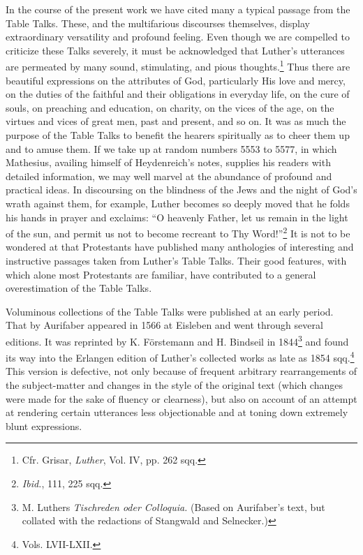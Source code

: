 In the course of the present work we have cited many a typical
passage from the Table Talks. These, and the multifarious discourses
themselves, display extraordinary versatility and profound feeling.
Even though we are compelled to criticize these Talks severely, it
must be acknowledged that Luther’s utterances are permeated by
many sound, stimulating, and pious thoughts.\footnote{Cfr. Grisar, \textit{Luther}, Vol. IV, pp. 262 sqq.}
 Thus there are beautiful
expressions on the attributes of God, particularly His love and
mercy, on the duties of the faithful and their obligations in everyday
life, on the cure of souls, on preaching and education, on charity,
on the vices of the age, on the virtues and vices of great men, past and
present, and so on. It was as much the purpose of the Table Talks
to benefit the hearers spiritually as to cheer them up and to amuse
them. If we take up at random numbers 5553 to 5577, in which
Mathesius, availing himself of Heydenreich’s notes, supplies his readers
with detailed information, we may well marvel at the abundance
of profound and practical ideas. In discoursing on the blindness of
the Jews and the night of God’s wrath against them, for example,
Luther becomes so deeply moved that he folds his hands in prayer
and exclaims: “O heavenly Father, let us remain in the light of the
sun, and permit us not to become recreant to Thy Word!”\footnote{\textit{Ibid.}, 111, 225 sqq.}
 It is not
to be wondered at that Protestants have published many anthologies
of interesting and instructive passages taken from Luther’s Table
Talks. Their good features, with which alone most Protestants are
familiar, have contributed to a general overestimation of the Table
Talks.

Voluminous collections of the Table Talks were published at an
early period. That by Aurifaber appeared in 1566 at Eisleben and
went through several editions. It was reprinted by K. Förstemann and
H. Bindseil in 1844\footnote
{M. Luthers \textit{Tischreden oder Colloquia.} (Based on Aurifaber’s text, but collated with
the redactions of Stangwald and Selnecker.)}
and found its way into the Erlangen edition
of Luther’s collected works as late as 1854 sqq.\footnote{Vols. LVII-LXII.}
 This version is defective,
not only because of frequent arbitrary rearrangements of the
subject-matter and changes in the style of the original text (which
changes were made for the sake of fluency or clearness), but also on
account of an attempt at rendering certain utterances less objectionable
and at toning down extremely blunt expressions.

